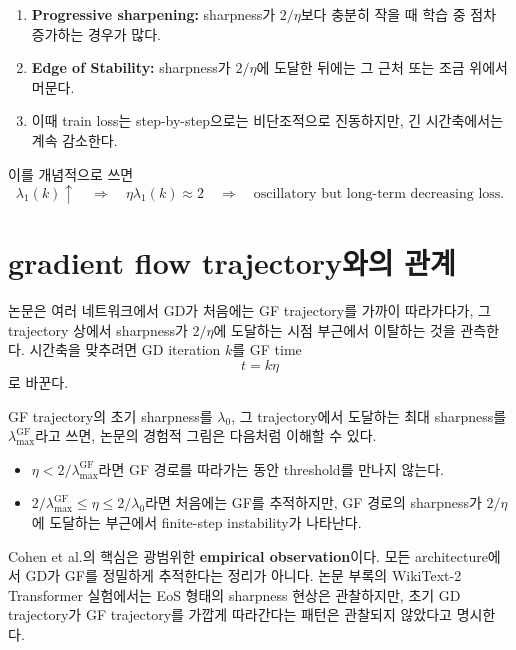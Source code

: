 \documentclass[11pt,a4paper,oneside,openany]{memoir}
\theoremstyle{definition}
\begin{document}
\begin{paperbox}
\begin{enumerate}
  \item \textbf{Progressive sharpening:} sharpness가 $2/\eta$보다 충분히 작을 때 학습 중 점차 증가하는 경우가 많다.
  \item \textbf{Edge of Stability:} sharpness가 $2/\eta$에 도달한 뒤에는 그 근처 또는 조금 위에서 머문다.
  \item 이때 train loss는 step-by-step으로는 비단조적으로 진동하지만, 긴 시간축에서는 계속 감소한다.
\end{enumerate}
\end{paperbox}

이를 개념적으로 쓰면
\begin{equation}
  \lambda_1(k)
  \uparrow
  \quad\Longrightarrow\quad
  \eta\lambda_1(k)\approx2
  \quad\Longrightarrow\quad
  \text{oscillatory but long-term decreasing loss}.
\end{equation}

\section{gradient flow trajectory와의 관계}

논문은 여러 네트워크에서 GD가 처음에는 GF trajectory를 가까이 따라가다가,
그 trajectory 상에서 sharpness가 $2/\eta$에 도달하는 시점 부근에서 이탈하는 것을 관측한다.
시간축을 맞추려면 GD iteration $k$를 GF time
\begin{equation}
  t=k\eta
\end{equation}
로 바꾼다.

GF trajectory의 초기 sharpness를 $\lambda_0$, 그 trajectory에서 도달하는 최대 sharpness를
$\lambda_{\max}^{\mathrm{GF}}$라고 쓰면, 논문의 경험적 그림은 다음처럼 이해할 수 있다.

\begin{itemize}
  \item $\eta<2/\lambda_{\max}^{\mathrm{GF}}$라면 GF 경로를 따라가는 동안 threshold를 만나지 않는다.
  \item $2/\lambda_{\max}^{\mathrm{GF}}\le\eta\le2/\lambda_0$라면 처음에는 GF를 추적하지만,
  GF 경로의 sharpness가 $2/\eta$에 도달하는 부근에서 finite-step instability가 나타난다.
\end{itemize}

\begin{warningbox}
Cohen et al.의 핵심은 광범위한 \textbf{empirical observation}이다.
모든 architecture에서 GD가 GF를 정밀하게 추적한다는 정리가 아니다.
논문 부록의 WikiText-2 Transformer 실험에서는 EoS 형태의 sharpness 현상은 관찰하지만,
초기 GD trajectory가 GF trajectory를 가깝게 따라간다는 패턴은 관찰되지 않았다고 명시한다.
\end{warningbox}
\end{document}
